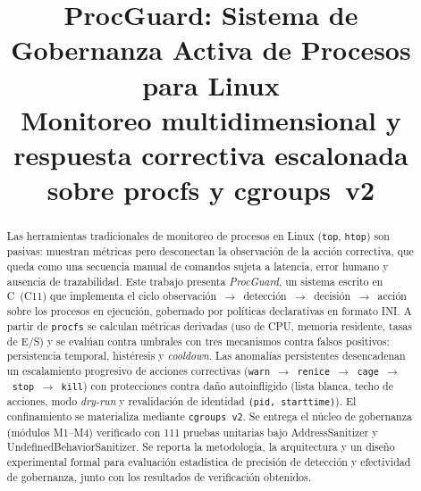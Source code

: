 \documentclass[conference]{IEEEtran}
\begin{document}
\title{ProcGuard: Sistema de Gobernanza Activa de Procesos para Linux\\
\large Monitoreo multidimensional y respuesta correctiva escalonada sobre procfs y cgroups~v2}

\author{
}

\maketitle

\begin{abstract}
Las herramientas tradicionales de monitoreo de procesos en Linux (\texttt{top},
\texttt{htop}) son pasivas: muestran métricas pero desconectan la observación de
la acción correctiva, que queda como una secuencia manual de comandos sujeta a
latencia, error humano y ausencia de trazabilidad. Este trabajo presenta
\emph{ProcGuard}, un sistema escrito en C~(C11) que implementa el ciclo
observación~$\rightarrow$~detección~$\rightarrow$~decisión~$\rightarrow$~acción
sobre los procesos en ejecución, gobernado por políticas declarativas en formato
INI. A partir de \texttt{procfs} se calculan métricas derivadas (uso de CPU,
memoria residente, tasas de E/S) y se evalúan contra umbrales con tres
mecanismos contra falsos positivos: persistencia temporal, histéresis y
\emph{cooldown}. Las anomalías persistentes desencadenan un escalamiento
progresivo de acciones correctivas
(\texttt{warn}~$\rightarrow$~\texttt{renice}~$\rightarrow$~\texttt{cage}~$\rightarrow$~\texttt{stop}~$\rightarrow$~\texttt{kill})
con protecciones contra daño autoinfligido (lista blanca, techo de acciones,
modo \emph{dry-run} y revalidación de identidad \texttt{(pid, starttime)}). El
confinamiento se materializa mediante \texttt{cgroups~v2}. Se entrega el núcleo
de gobernanza (módulos M1--M4) verificado con 111 pruebas unitarias bajo
AddressSanitizer y UndefinedBehaviorSanitizer. Se reporta la metodología, la
arquitectura y un diseño experimental formal para evaluación estadística de
precisión de detección y efectividad de gobernanza, junto con los resultados de
verificación obtenidos.
\end{abstract}
\end{document}

